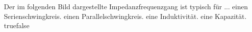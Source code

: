     {Der im folgenden Bild dargestellte Impedanzfrequenzgang ist typisch für ...}
    {einen Serienschwingkreis.}
    {einen Parallelschwingkreis.}
    {eine Induktivität.}
    {eine Kapazität.}
    {true}{false}